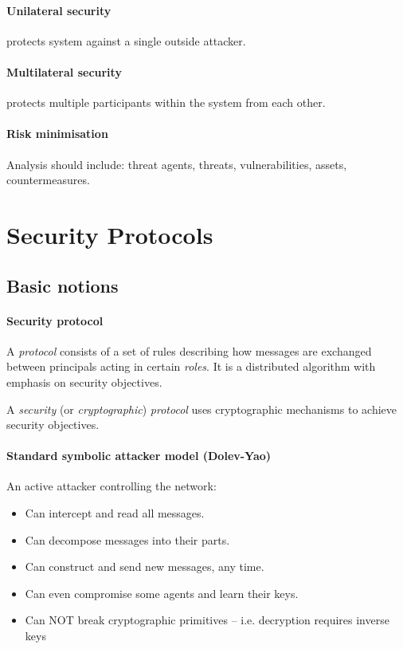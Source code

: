 \paragraph{Unilateral security} protects system against a single outside attacker.

\paragraph{Multilateral security} protects multiple participants within the system from each other.

\paragraph{Risk minimisation} Analysis should include: threat agents, threats, vulnerabilities, assets, countermeasures.


\newpage
\section{Security Protocols}

\subsection{Basic notions}

\paragraph{Security protocol} A \textit{protocol} consists of a set of rules describing how messages are exchanged between principals acting in certain \textit{roles}. It is a distributed algorithm with emphasis on security objectives.

A \textit{security} (or \textit{cryptographic}) \textit{protocol} uses cryptographic mechanisms to achieve security objectives.

\paragraph{Standard symbolic attacker model (Dolev-Yao)} An active attacker controlling the network:

\begin{itemize}
    \item Can intercept and read all messages.
    \item Can decompose messages into their parts.
    \item Can construct and send new messages, any time. 
    \item Can even compromise some agents and learn their keys.
    \item Can NOT break cryptographic primitives -- i.e. decryption requires inverse keys
\end{itemize}

